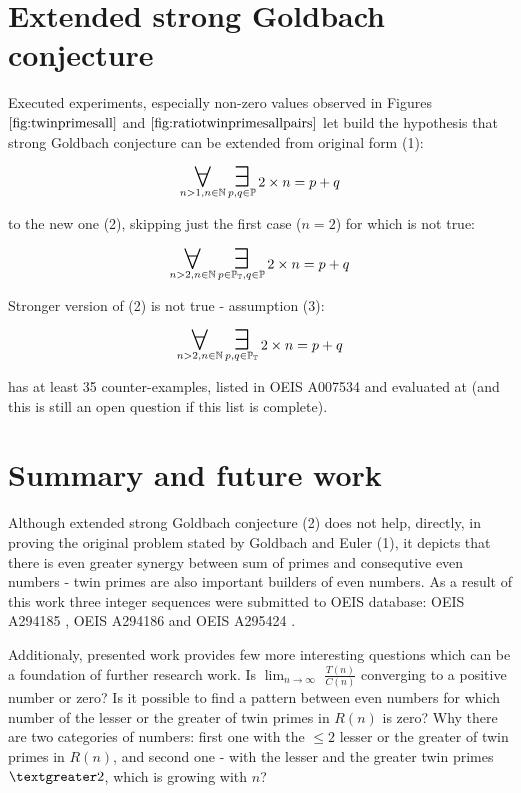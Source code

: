 \documentclass[10pt,twocolumn]{article}
\newcommand\bigforall{\mbox{\huge $\mathsurround0pt\forall$}}
\newcommand\bigexists{\mbox{\huge $\mathsurround0pt\exists$}}
\begin{document}
\section{Extended strong Goldbach conjecture}

Executed experiments, especially non-zero values observed in Figures $\ref{fig:twinprimesall}$ and $\ref{fig:ratiotwinprimesallpairs}$ let build the hypothesis that strong Goldbach conjecture can be extended from original form (1):

\begin{equation}
\displaystyle\mathop{\bigforall}_{n>1, n \in \mathbb{N}} \displaystyle\mathop{\bigexists}_{p, q \in \mathbb{P}} 2 \times n = p + q
\end{equation}

to the new one (2), skipping just the first case ($n = 2$) for which is not true:

\begin{equation}
\displaystyle\mathop{\bigforall}_{n>2, n \in \mathbb{N}} \displaystyle\mathop{\bigexists}_{p \in \mathbb{P_T}, q \in \mathbb{P}} 2 \times n = p + q
\end{equation}

Stronger version of (2) is not true - assumption (3):

\begin{equation}
\displaystyle\mathop{\bigforall}_{n>2, n \in \mathbb{N}} \displaystyle\mathop{\bigexists}_{p, q \in \mathbb{P_T}} 2 \times n = p + q
\end{equation}

has at least 35 counter-examples, listed in OEIS A007534 \cite{A007534} and evaluated at \cite{zwillinger1979} (and this is still an open question if this list is complete).

\section{Summary and future work}

Although extended strong Goldbach conjecture (2) does not help, directly, in proving the original problem stated by Goldbach and Euler (1), it depicts that there is even greater synergy between sum of primes and consequtive even numbers - twin primes are also important builders of even numbers. As a result of this work three integer sequences were submitted to OEIS database: OEIS A294185 \cite{A294185}, OEIS A294186 \cite{A294186} and OEIS A295424 \cite{A295424}. \par
Additionaly, presented work provides few more interesting questions which can be a foundation of further research work. Is $\displaystyle{\lim_{n \to \infty}}$ $\frac{T(n)}{C(n)}$ converging to a positive number or zero? Is it possible to find a pattern between even numbers for which number of the lesser or the greater of twin primes in $R(n)$ is zero? Why there are two categories of numbers: first one with the $\leq 2$ lesser or the greater of twin primes in $R(n)$, and second one - with the lesser and the greater twin primes $\textgreater 2$, which is growing with $n$?\par
\end{document}

